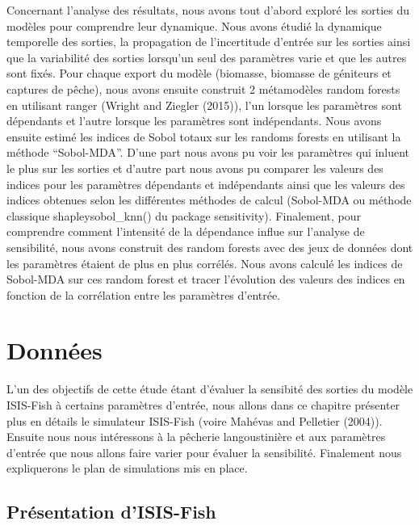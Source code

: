 \documentclass[
]{article}
\begin{document}
Concernant l'analyse des résultats, nous avons tout d'abord exploré les
sorties du modèles pour comprendre leur dynamique. Nous avons étudié la
dynamique temporelle des sorties, la propagation de l'incertitude
d'entrée sur les sorties ainsi que la variabilité des sorties lorsqu'un
seul des paramètres varie et que les autres sont fixés. Pour chaque
export du modèle (biomasse, biomasse de géniteurs et captures de pêche),
nous avons ensuite construit 2 métamodèles random forests en utilisant
ranger (Wright and Ziegler (2015)), l'un lorsque les paramètres sont
dépendants et l'autre lorsque les paramètres sont indépendants. Nous
avons ensuite estimé les indices de Sobol totaux sur les randoms forests
en utilisant la méthode ``Sobol-MDA''. D'une part nous avons pu voir les
paramètres qui inluent le plus sur les sorties et d'autre part nous
avons pu comparer les valeurs des indices pour les paramètres dépendants
et indépendants ainsi que les valeurs des indices obtenues selon les
différentes méthodes de calcul (Sobol-MDA ou méthode classique
shapleysobol\_knn() du package sensitivity). Finalement, pour comprendre
comment l'intensité de la dépendance influe sur l'analyse de
sensibilité, nous avons construit des random forests avec des jeux de
données dont les paramètres étaient de plus en plus corrélés. Nous avons
calculé les indices de Sobol-MDA sur ces random forest et tracer
l'évolution des valeurs des indices en fonction de la corrélation entre
les paramètres d'entrée.

\hypertarget{donnuxe9es}{%
\section{Données}\label{donnuxe9es}}

L'un des objectifs de cette étude étant d'évaluer la sensibité des
sorties du modèle ISIS-Fish à certains paramètres d'entrée, nous allons
dans ce chapitre présenter plus en détails le simulateur ISIS-Fish
(voire Mahévas and Pelletier (2004)). Ensuite nous nous intéressons à la
pêcherie langoustinière et aux paramètres d'entrée que nous allons faire
varier pour évaluer la sensibilité. Finalement nous expliquerons le plan
de simulations mis en place.

\hypertarget{pruxe9sentation-disis-fish}{%
\subsection{Présentation d'ISIS-Fish}\label{pruxe9sentation-disis-fish}}
\end{document}
